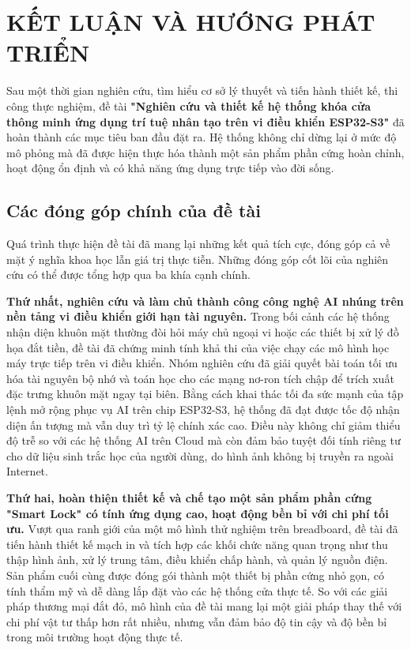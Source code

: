 \chapter{KẾT LUẬN VÀ HƯỚNG PHÁT TRIỂN}

Sau một thời gian nghiên cứu, tìm hiểu cơ sở lý thuyết và tiến hành thiết kế, thi công thực nghiệm, đề tài \textbf{"Nghiên cứu và thiết kế hệ thống khóa cửa thông minh ứng dụng trí tuệ nhân tạo trên vi điều khiển ESP32-S3"} đã hoàn thành các mục tiêu ban đầu đặt ra. Hệ thống không chỉ dừng lại ở mức độ mô phỏng mà đã được hiện thực hóa thành một sản phẩm phần cứng hoàn chỉnh, hoạt động ổn định và có khả năng ứng dụng trực tiếp vào đời sống.

\section{Các đóng góp chính của đề tài}

Quá trình thực hiện đề tài đã mang lại những kết quả tích cực, đóng góp cả về mặt ý nghĩa khoa học lẫn giá trị thực tiễn. Những đóng góp cốt lõi của nghiên cứu có thể được tổng hợp qua ba khía cạnh chính.

\textbf{Thứ nhất, nghiên cứu và làm chủ thành công công nghệ AI nhúng trên nền tảng vi điều khiển giới hạn tài nguyên.} Trong bối cảnh các hệ thống nhận diện khuôn mặt thường đòi hỏi máy chủ ngoại vi hoặc các thiết bị xử lý đồ họa đắt tiền, đề tài đã chứng minh tính khả thi của việc chạy các mô hình học máy trực tiếp trên vi điều khiển. Nhóm nghiên cứu đã giải quyết bài toán tối ưu hóa tài nguyên bộ nhớ và toán học cho các mạng nơ-ron tích chập để trích xuất đặc trưng khuôn mặt ngay tại biên. Bằng cách khai thác tối đa sức mạnh của tập lệnh mở rộng phục vụ AI trên chip ESP32-S3, hệ thống đã đạt được tốc độ nhận diện ấn tượng mà vẫn duy trì tỷ lệ chính xác cao. Điều này không chỉ giảm thiểu độ trễ so với các hệ thống AI trên Cloud mà còn đảm bảo tuyệt đối tính riêng tư cho dữ liệu sinh trắc học của người dùng, do hình ảnh không bị truyền ra ngoài Internet.

\textbf{Thứ hai, hoàn thiện thiết kế và chế tạo một sản phẩm phần cứng "Smart Lock" có tính ứng dụng cao, hoạt động bền bỉ với chi phí tối ưu.} Vượt qua ranh giới của một mô hình thử nghiệm trên breadboard, đề tài đã tiến hành thiết kế mạch in và tích hợp các khối chức năng quan trọng như thu thập hình ảnh, xử lý trung tâm, điều khiển chấp hành, và quản lý nguồn điện. Sản phẩm cuối cùng được đóng gói thành một thiết bị phần cứng nhỏ gọn, có tính thẩm mỹ và dễ dàng lắp đặt vào các hệ thống cửa thực tế. So với các giải pháp thương mại đắt đỏ, mô hình của đề tài mang lại một giải pháp thay thế với chi phí vật tư thấp hơn rất nhiều, nhưng vẫn đảm bảo độ tin cậy và độ bền bỉ trong môi trường hoạt động thực tế.

